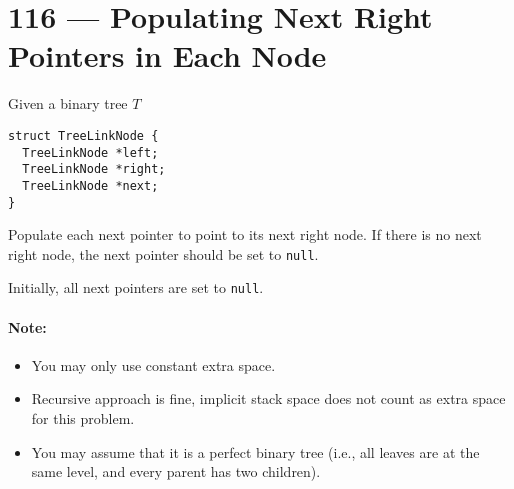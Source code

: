 
\section{116 --- Populating Next Right Pointers in Each Node}
Given a binary tree $T$

\begin{lstlisting}[style=customc]
struct TreeLinkNode {
  TreeLinkNode *left;
  TreeLinkNode *right;
  TreeLinkNode *next;
}
\end{lstlisting}
Populate each next pointer to point to its next right node. If there is no next right node, the next pointer should be set to \texttt{null}.
\par
Initially, all next pointers are set to \texttt{null}.
\paragraph{Note:}
\begin{itemize}
    \item You may only use constant extra space.
    \item Recursive approach is fine, implicit stack space does not count as extra space for this problem.
    \item You may assume that it is a perfect binary tree (i.e., all leaves are at the same level, and every parent has two children).
\end{itemize}
